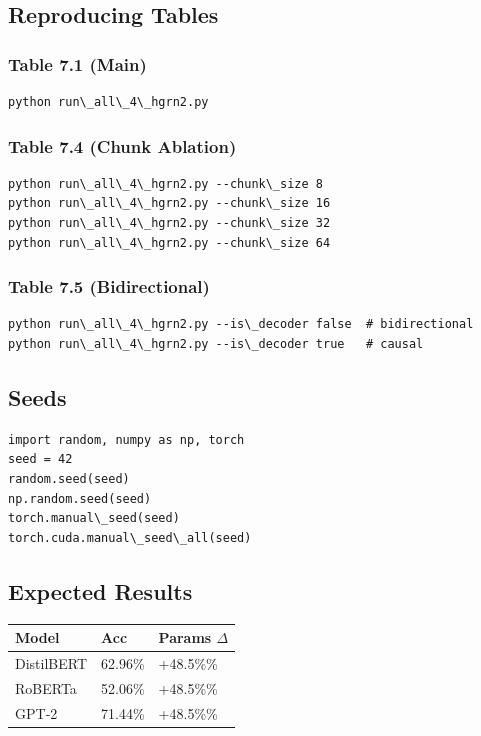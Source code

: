 \subsection{Reproducing Tables}

\subsubsection{Table 7.1 (Main)}
\begin{lstlisting}
python run\_all\_4\_hgrn2.py
\end{lstlisting}

\subsubsection{Table 7.4 (Chunk Ablation)}
\begin{lstlisting}
python run\_all\_4\_hgrn2.py --chunk\_size 8
python run\_all\_4\_hgrn2.py --chunk\_size 16
python run\_all\_4\_hgrn2.py --chunk\_size 32
python run\_all\_4\_hgrn2.py --chunk\_size 64
\end{lstlisting}

\subsubsection{Table 7.5 (Bidirectional)}
\begin{lstlisting}
python run\_all\_4\_hgrn2.py --is\_decoder false  # bidirectional
python run\_all\_4\_hgrn2.py --is\_decoder true   # causal
\end{lstlisting}

\subsection{Seeds}

\begin{lstlisting}
import random, numpy as np, torch
seed = 42
random.seed(seed)
np.random.seed(seed)
torch.manual\_seed(seed)
torch.cuda.manual\_seed\_all(seed)
\end{lstlisting}

\subsection{Expected Results}

\begin{table}[H]
\centering
\small
\begin{tabular}{lll}
\toprule
\textbf{Model} & \textbf{Acc} & \textbf{Params $\Delta$} \\
\midrule
DistilBERT & 62.96\% & +48.5\%\% \\
RoBERTa & 52.06\% & +48.5\%\% \\
GPT-2 & 71.44\% & +48.5\%\% \\
\bottomrule
\end{tabular}
\end{table}

